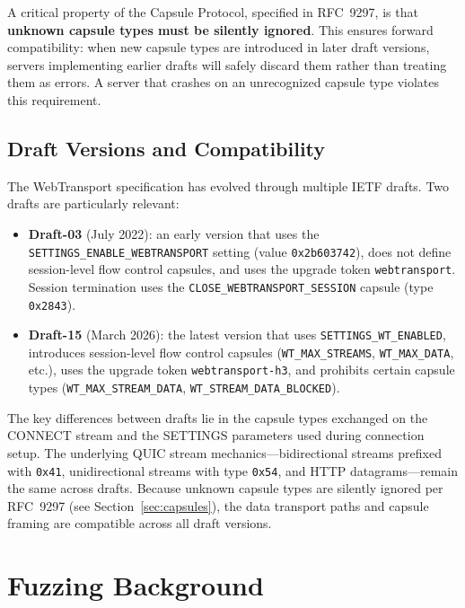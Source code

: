 A critical property of the Capsule Protocol, specified in RFC~9297, is that \textbf{unknown capsule types must be silently ignored}. This ensures forward compatibility: when new capsule types are introduced in later draft versions, servers implementing earlier drafts will safely discard them rather than treating them as errors. A server that crashes on an unrecognized capsule type violates this requirement.

\subsection{Draft Versions and Compatibility}
\label{sec:draft-compat}

The WebTransport specification has evolved through multiple IETF drafts. Two drafts are particularly relevant:

\begin{itemize}
    \item \textbf{Draft-03} (July 2022): an early version that uses the \texttt{SETTINGS\-\_ENABLE\-\_WEBTRANSPORT} setting (value \texttt{0x2b603742}), does not define session-level flow control capsules, and uses the upgrade token \texttt{webtransport}. Session termination uses the \texttt{CLOSE\-\_WEBTRANSPORT\-\_SESSION} capsule (type \texttt{0x2843}).
    \item \textbf{Draft-15} (March 2026): the latest version that uses \texttt{SETTINGS\_WT\_ENABLED}, introduces session-level flow control capsules (\texttt{WT\_MAX\_STREAMS}, \texttt{WT\_MAX\_DATA}, etc.), uses the upgrade token \texttt{webtransport-h3}, and prohibits certain capsule types (\texttt{WT\_MAX\-\_STREAM\_DATA}, \texttt{WT\_STREAM\-\_DATA\-\_BLOCKED}).
\end{itemize}

The key differences between drafts lie in the capsule types exchanged on the CONNECT stream and the SETTINGS parameters used during connection setup. The underlying QUIC stream mechanics---bidirectional streams prefixed with \texttt{0x41}, unidirectional streams with type \texttt{0x54}, and HTTP datagrams---remain the same across drafts. Because unknown capsule types are silently ignored per RFC~9297 (see Section~\ref{sec:capsules}), the data transport paths and capsule framing are compatible across all draft versions.

\section{Fuzzing Background}

